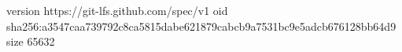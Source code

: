 version https://git-lfs.github.com/spec/v1
oid sha256:a3547caa739792c8ca5815dabe621879cabcb9a7531bc9e5adcb676128bb64d9
size 65632
